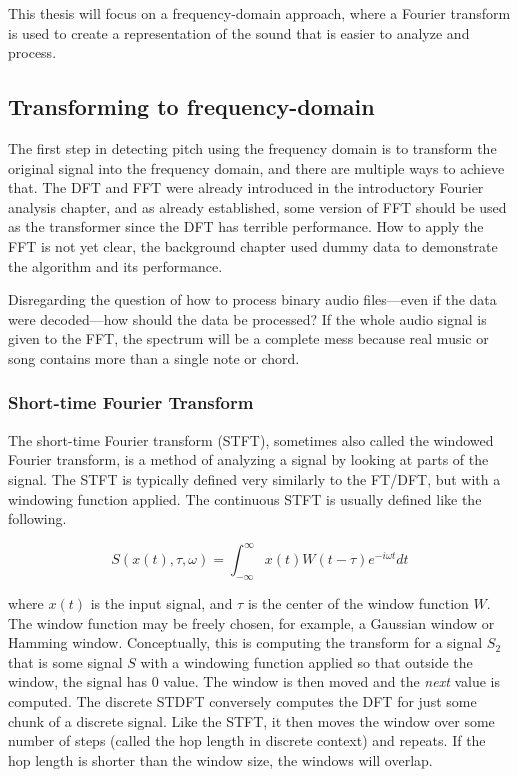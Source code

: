 This thesis will focus on a frequency-domain approach, where a Fourier transform is used to create a representation of the sound that is easier to analyze and process.

\subsection{Transforming to frequency-domain}
The first step in detecting pitch using the frequency domain is to transform the original signal into the frequency domain, and there are multiple ways to achieve that. The DFT and FFT were already introduced in the introductory Fourier analysis chapter, and as already established, some version of FFT should be used as the transformer since the DFT has terrible performance. How to apply the FFT is not yet clear, the background chapter used dummy data to demonstrate the algorithm and its performance. 

Disregarding the question of how to process binary audio files—even if the data were decoded—how should the data be processed? If the whole audio signal is given to the FFT, the spectrum will be a complete mess because real music or song contains more than a single note or chord.

\subsubsection{Short-time Fourier Transform}
The short-time Fourier transform (STFT), sometimes also called the windowed Fourier transform, is a method of analyzing a signal by looking at parts of the signal. The STFT is typically defined very similarly to the FT/DFT, but with a windowing function applied. The continuous STFT is usually defined like the following.

$$S(x(t), \tau, \omega ) = \int_{-\infty}^{\infty} x(t)W(t-\tau)e^{-i\omega t}dt$$

where $x(t)$ is the input signal, and $\tau$ is the center of the window function $W$. The window function may be freely chosen, for example, a Gaussian window or Hamming window. Conceptually, this is computing the transform for a signal $S_2$ that is some signal $S$ with a windowing function applied so that outside the window, the signal has 0 value. The window is then moved and the \textit{next} value is computed. The discrete STDFT conversely computes the DFT for just some chunk of a discrete signal. Like the STFT, it then moves the window over some number of steps (called the hop length in discrete context) and repeats. If the hop length is shorter than the window size, the windows will overlap.

